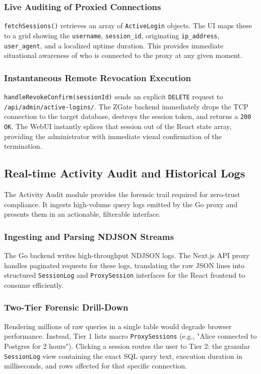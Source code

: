 \subsubsection{Live Auditing of Proxied Connections}
\texttt{fetchSessions()} retrieves an array of \texttt{ActiveLogin} objects. The UI maps these to a grid showing the \texttt{username}, \texttt{session\_id}, originating \texttt{ip\_address}, \texttt{user\_agent}, and a localized uptime duration. This provides immediate situational awareness of who is connected to the proxy at any given moment.

\subsubsection{Instantaneous Remote Revocation Execution}
\texttt{handleRevokeConfirm(sessionId)} sends an explicit \texttt{DELETE} request to \texttt{/api/\allowbreak admin/\allowbreak active-logins/\allowbreak [sessionId]}. The ZGate backend immediately drops the TCP connection to the target database, destroys the session token, and returns a \texttt{200 OK}. The WebUI instantly splices that session out of the React state array, providing the administrator with immediate visual confirmation of the termination.

\subsection{Real-time Activity Audit and Historical Logs}
The Activity Audit module provides the forensic trail required for zero-trust compliance. It ingests high-volume query logs emitted by the Go proxy and presents them in an actionable, filterable interface.

\subsubsection{Ingesting and Parsing NDJSON Streams}
The Go backend writes high-throughput NDJSON logs. The Next.js API proxy handles paginated requests for these logs, translating the raw JSON lines into structured \texttt{SessionLog} and \texttt{ProxySession} interfaces for the React frontend to consume efficiently.

\subsubsection{Two-Tier Forensic Drill-Down}
Rendering millions of raw queries in a single table would degrade browser performance. Instead, Tier 1 lists macro \texttt{ProxySessions} (e.g., "Alice connected to Postgres for 2 hours"). Clicking a session routes the user to Tier 2: the granular \texttt{SessionLog} view containing the exact SQL query text, execution duration in milliseconds, and rows affected for that specific connection.

